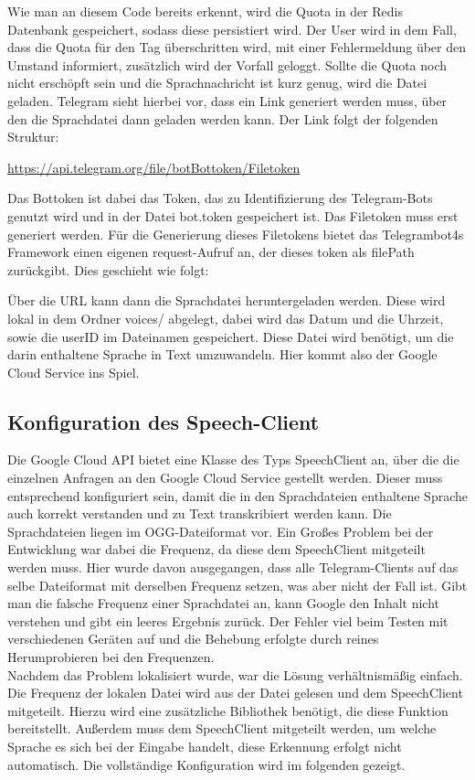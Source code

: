 
Wie man an diesem Code bereits erkennt, wird die Quota in der Redis Datenbank gespeichert, sodass diese persistiert wird. Der User wird in dem Fall, dass die Quota für den Tag überschritten wird, mit einer Fehlermeldung über den Umstand informiert, zusätzlich wird der Vorfall geloggt.
Sollte die Quota noch nicht erschöpft sein und die Sprachnachricht ist kurz genug, wird die Datei geladen. Telegram sieht hierbei vor, dass ein Link generiert werden muss, über den die Sprachdatei dann geladen werden kann. Der Link folgt der folgenden Struktur:

\url{https://api.telegram.org/file/botBottoken/Filetoken}

Das Bottoken ist dabei das Token, das zu Identifizierung des Telegram-Bots genutzt wird und in der Datei bot.token gespeichert ist. Das Filetoken muss erst generiert werden. Für die Generierung dieses Filetokens bietet das Telegrambot4s Framework einen eigenen request-Aufruf an, der dieses token als filePath zurückgibt. Dies geschieht wie folgt:


Über die URL kann dann die Sprachdatei heruntergeladen werden. Diese wird lokal in dem Ordner voices/ abgelegt, dabei wird das Datum und die Uhrzeit, sowie die userID im Dateinamen gespeichert.
Diese Datei wird benötigt, um die darin enthaltene Sprache in Text umzuwandeln. Hier kommt also der Google Cloud Service ins Spiel.

\subsection{Konfiguration des Speech-Client}
Die Google Cloud API bietet eine Klasse des Typs SpeechClient an, über die die einzelnen Anfragen an den Google Cloud Service gestellt werden. Dieser muss entsprechend konfiguriert sein, damit die in den Sprachdateien enthaltene Sprache auch korrekt verstanden und zu Text transkribiert werden kann.
Die Sprachdateien liegen im OGG-Dateiformat vor. Ein Großes Problem bei der Entwicklung war dabei die Frequenz, da diese dem SpeechClient mitgeteilt werden muss. Hier wurde davon ausgegangen, dass alle Telegram-Clients auf das selbe Dateiformat mit derselben Frequenz setzen, was aber nicht der Fall ist. Gibt man die falsche Frequenz einer Sprachdatei an, kann Google den Inhalt nicht verstehen und gibt ein leeres Ergebnis zurück. Der Fehler viel beim Testen mit verschiedenen Geräten auf und die Behebung erfolgte durch reines Herumprobieren bei den Frequenzen. \\
Nachdem das Problem lokalisiert wurde, war die Lösung verhältnismäßig einfach. Die Frequenz der lokalen Datei wird aus der Datei gelesen und dem SpeechClient mitgeteilt. Hierzu wird eine zusätzliche Bibliothek benötigt, die diese Funktion bereitstellt. Außerdem muss dem SpeechClient mitgeteilt werden, um welche Sprache es sich bei der Eingabe handelt, diese Erkennung erfolgt nicht automatisch. Die vollständige Konfiguration wird im folgenden gezeigt.

